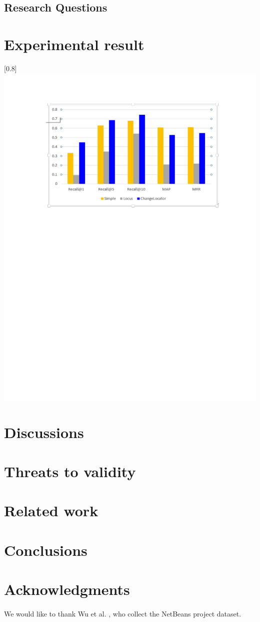 \documentclass[a4paper]{article}
\begin{document}
\subsection{Research Questions}


\section{Experimental result}

\scalebox{0.8}[0.8]{\centering\includegraphics{compare.pdf}}

\section{Discussions}



\section{Threats to validity}



\section{Related work}



\section{Conclusions}


\section{Acknowledgments}
\paragraph{}
We would like to thank Wu et al.\cite{ChangeLocator} , who collect the NetBeans project dataset.




\end{document}
